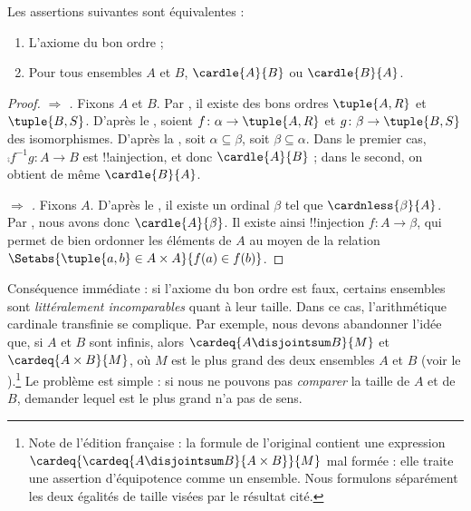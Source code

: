 \documentclass[../../../include/open-logic-section]{subfiles}
\begin{document}
\begin{thm}
Les assertions suivantes sont équivalentes :
\begin{enumerate}
	\item{}
	L'axiome du bon ordre ;
	\item{}
	Pour tous ensembles $A$ et $B$,
	$\cardle{A}{B}$ ou $\cardle{B}{A}$.
\end{enumerate}
\end{thm}

\begin{proof}
\emph{ $\Rightarrow$
.}
Fixons $A$ et $B$. Par ,
il existe des bons ordres
$\tuple{A, R}$ et $\tuple{B, S}$.
D'après le
,
soient $f \colon \alpha \to \tuple{A, R}$
et $g \colon \beta \to \tuple{B, S}$
des isomorphismes. D'après la
,
soit $\alpha \subseteq \beta$, soit
$\beta \subseteq \alpha$.
Dans le premier cas,
$\comp{f^{-1}}{g} \colon A \to B$
est !!a{injection}, et donc
$\cardle{A}{B}$ ; dans le second,
on obtient de même $\cardle{B}{A}$.

\emph{ $\Rightarrow$
.}
Fixons $A$. D'après le ,
il existe un ordinal $\beta$ tel que
$\cardnless{\beta}{A}$.
Par , nous avons
donc $\cardle{A}{\beta}$.
Il existe ainsi !!{injection}
$f \colon A \to \beta$, qui permet
de bien ordonner les éléments de $A$
au moyen de la relation
$\Setabs{\tuple{a, b} \in A \times A}
{f(a) \in f(b)}$.
\end{proof}
\noindent
Conséquence immédiate : si l'axiome
du bon ordre est faux, certains ensembles
sont \emph{littéralement incomparables}
quant à leur taille. Dans ce cas,
l'arithmétique cardinale transfinie
se complique. Par exemple, nous devons
abandonner l'idée que, si $A$ et $B$
sont infinis, alors
$\cardeq{A \disjointsum B}{M}$
et $\cardeq{A \times B}{M}$,
où $M$ est le plus grand des deux
ensembles $A$ et $B$
(voir le ).\footnote{
Note de l'édition française : la formule
de l'original contient une expression
$\cardeq{\cardeq{A \disjointsum B}{A \times B}}{M}$
mal formée : elle traite une assertion
d'équipotence comme un ensemble.
Nous formulons séparément les deux égalités
de taille visées par le résultat cité.}
Le problème est simple : si nous ne pouvons
pas \emph{comparer} la taille de $A$ et de $B$,
demander lequel est le plus grand n'a pas
de sens.
\end{document}
